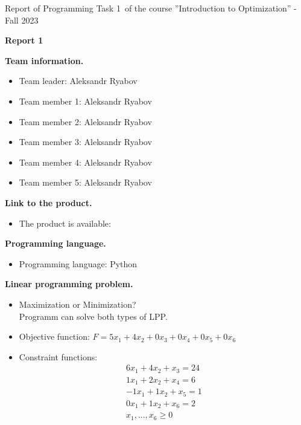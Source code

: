 \documentclass[12pt, legalpaper]{exam}
\newcommand{\course}{Introduction to Optimization}
\newcommand{\term}{Fall 2023}
\newcommand{\examnum}{Report of Programming Task 1}
\begin{document}
\noindent \examnum \, of the  course ''\course'' - \term


\noindent
{}




\vspace{12pt}
\begin{center}
    \textbf{Report 1}
\end{center}

\vspace{12pt}

\noindent  \textbf{Team information.}

\begin{itemize}
    \item Team leader: Aleksandr Ryabov
    \item Team member 1: Aleksandr Ryabov
    \item Team member 2: Aleksandr Ryabov
    \item Team member 3: Aleksandr Ryabov
    \item Team member 4: Aleksandr Ryabov
    \item Team member 5: Aleksandr Ryabov
\end{itemize}
\vspace{12pt}
\noindent     \textbf{Link to the product.}
\begin{itemize}
    \item The product is available:  
\end{itemize}

\vspace{12pt}

\noindent  \textbf{Programming language.}
\begin{itemize}
    \item Programming language: Python
\end{itemize}

\vspace{12pt}

\noindent  \textbf{Linear programming problem.}
\begin{itemize}
\item Maximization or Minimization?
\\
Programm can solve both types of LPP. 
\vspace{10pt}
    \item Objective function: $F = 5x_1 + 4x_2 + 0x_3 + 0x_4 + 0x_5 + 0x_6$
    \vspace{10pt}
    \item Constraint functions:
    \begin{gather*}
        6x_1 + 4x_2 + x_3 = 24 \\
        1x_1 + 2x_2 + x_4 = 6  \\
        -1x_1 + 1x_2 + x_5 = 1 \\
        0x_1 + 1x_2 + x_6 = 2  \\
        x_1,...,x_6 \geq 0
    \end{gather*}
    \vspace{2cm}
\end{itemize}
\end{document}
